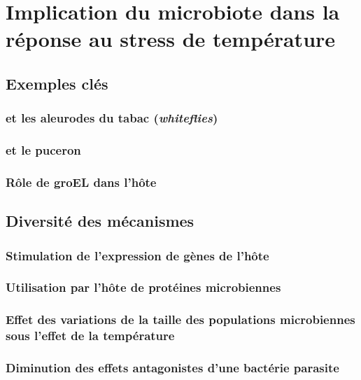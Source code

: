 \chapter{Implication du microbiote dans la réponse au stress de température} %
\label{sec:implicationµbiote}
	
	\section{Exemples clés} %
	\label{sec:exemples}
		

		\subsection{ et les aleurodes du tabac (\textit{whiteflies})} %
		\label{sub:rickettsia_et_les_aleurodes}
			

		\subsection{ et le puceron } %
		\label{sub:exemple_buchnera}
			

		\subsection{Rôle de groEL dans l'hôte } %
		\label{sub:groel}
			

	\section{Diversité des mécanismes} %
	\label{sec:diversit_des_m_canismes}
		

		\subsection{Stimulation de l'expression de gènes de l'hôte} %
		\label{sub:gènes_hôte}
			

		\subsection{Utilisation par l'hôte de protéines microbiennes} %
		\label{sub:gènes_microbiens}
			

		\subsection{Effet des variations de la taille des populations microbiennes sous l'effet de la température} %
		\label{sub:pop_bact}
			

		\subsection{Diminution des effets antagonistes d'une bactérie parasite} %
		\label{sub:diminution_antagonisme}
			
